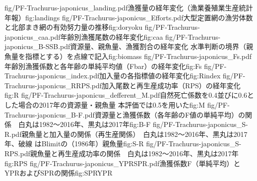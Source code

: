 
%
\Figs
{fig/PF-Trachurus-japonicus_landing.pdf}{漁獲量の経年変化（漁業養殖業生産統計年報）}{fig:landings}
\Figs
{fig/PF-Trachurus-japonicus_Efforts.pdf}{大型定置網の漁労体数と北部まき網の有効努力量の推移}{fig:doryoku}
\Figs
{fig/PF-Trachurus-japonicus_caa.pdf}{年齢別漁獲尾数の経年変化}{fig:caa}
\Figs
{fig/PF-Trachurus-japonicus_B-SSB.pdf}{資源量、親魚量、漁獲割合の経年変化 水準判断の境界（親魚量を指標とする）を点線で記入}{fig:biomass}
\Figs
{fig/PF-Trachurus-japonicus_Fs.pdf}{年齢別漁獲係数と各年齢の単純平均値（Fbar）の経年変化}{fig:Fs}
\Figs
{fig/PF-Trachurus-japonicus_index.pdf}{加入量の各指標値の経年変化}{fig:Rindex}
\Figs
{fig/PF-Trachurus-japonicus_RRPS.pdf}{加入尾数と再生産成功率（RPS）の経年変化}{fig:R}
\Figs
{fig/PF-Trachurus-japonicus_defferent_M.pdf}{自然死亡係数を0.4並びに0.6とした場合の2017年の資源量・親魚量 本評価では0.5を用いた}{fig:M}
\Figs
{fig/PF-Trachurus-japonicus_B-F.pdf}{資源量と漁獲係数（各年齢のF値の単純平均）の関係　白丸は1982～2016年、黒丸は2017年}{fig:B-F}
\Figs
{fig/PF-Trachurus-japonicus_S-R.pdf}{親魚量と加入量の関係（再生産関係）　白丸は1982～2016年、黒丸は2017年、破線 はBlimitの（1986年）親魚量}{fig:S-R}
\Figs
{fig/PF-Trachurus-japonicus_S-RPS.pdf}{親魚量と再生産成功率の関係　白丸は1982～2016年、黒丸は2017年}{fig:RPS}
\Figs
{fig/PF-Trachurus-japonicus_YPRSPR.pdf}{漁獲係数F（単純平均）とYPRおよびSPRの関係}{fig:SPRYPR}



%
%


